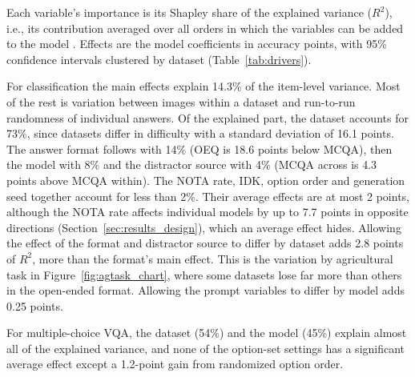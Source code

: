 \documentclass[10pt,letterpaper]{article}
\newcommand{\tablefont}{\footnotesize}
\begin{document}
Each variable's importance is its Shapley share of the explained variance ($R^2$), i.e., its contribution averaged over all orders in which the variables can be added to the model \cite{lindeman_introduction_1980}. Effects are the model coefficients in accuracy points, with 95\% confidence intervals clustered by dataset (Table~\ref{tab:drivers}).

\begin{table}[!tbp]
\centering
\caption{Relative importance of evaluation variables. R$^2$ (pts) is each variable's Shapley share of the variance explained by the main-effects model, in percentage points of $R^2$, and Share expresses it as a percentage of the explained variance. The interaction rows give the $R^2$ added to the main-effects model. Effects are changes in accuracy (points) relative to the default setting (MCQA within for the distractor source; MCQA for OEQ), with 95\% confidence intervals clustered by dataset. Seven models, Experiments 1--4.}
\label{tab:drivers}
\renewcommand{\arraystretch}{1.15}
\tablefont

\end{table}

For classification the main effects explain 14.3\% of the item-level variance. Most of the rest is variation between images within a dataset and run-to-run randomness of individual answers. Of the explained part, the dataset accounts for 73\%, since datasets differ in difficulty with a standard deviation of 16.1 points. The answer format follows with 14\% (OEQ is 18.6 points below MCQA), then the model with 8\% and the distractor source with 4\% (MCQA across is 4.3 points above MCQA within). The NOTA rate, IDK, option order and generation seed together account for less than 2\%. Their average effects are at most 2 points, although the NOTA rate affects individual models by up to 7.7 points in opposite directions (Section~\ref{sec:results_design}), which an average effect hides. Allowing the effect of the format and distractor source to differ by dataset adds 2.8 points of $R^2$, more than the format's main effect. This is the variation by agricultural task in Figure~\ref{fig:agtask_chart}, where some datasets lose far more than others in the open-ended format. Allowing the prompt variables to differ by model adds 0.25 points.

For multiple-choice VQA, the dataset (54\%) and the model (45\%) explain almost all of the explained variance, and none of the option-set settings has a significant average effect except a 1.2-point gain from randomized option order.
\end{document}
